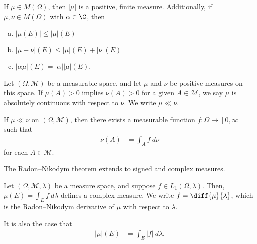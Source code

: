 \begin{fact}
  If $\mu\in M\left(\Omega\right)$, then $\left\vert \mu \right\vert$ is a positive, finite measure. Additionally, if $\mu,\nu\in M\left(\Omega\right)$ with $\alpha\in \C$, then
  \begin{enumerate}[(a)]
    \item $\left\vert \mu\left(E\right) \right\vert\leq \left\vert \mu \right\vert\left(E\right)$
    \item $\left\vert \mu + \nu \right\vert\left(E\right) \leq \left\vert \mu \right\vert\left(E\right) + \left\vert \nu \right\vert\left(E\right)$
    \item $\left\vert \alpha\mu \right\vert\left(E\right) = \left\vert \alpha \right\vert\left\vert \mu \right\vert\left(E\right)$.
  \end{enumerate}
\end{fact}
\begin{definition}
  Let $\left(\Omega,\mathcal{M}\right)$ be a measurable space, and let $\mu$ and $\nu$ be positive measures on this space. If $\mu(A) > 0$ implies $\nu(A) > 0$ for a given $A\in \mathcal{M}$, we say $\mu$ is absolutely continuous with respect to $\nu$. We write $\mu \ll \nu$.
\end{definition}
\begin{theorem}
  If $\mu \ll \nu$ on $\left(\Omega,\mathcal{M}\right)$, then there exists a measurable function $f: \Omega\rightarrow [0,\infty]$ such that
  \begin{align*}
    \nu(A) &= \int_{A}^{} f \:d\nu
  \end{align*}
  for each $A\in \mathcal{M}$.
\end{theorem}
\begin{remark}
The Radon--Nikodym theorem extends to signed and complex measures.
\end{remark}
\begin{fact}
  Let $\left(\Omega,\mathcal{M},\lambda\right)$ be a measure space, and suppose $f\in L_{1}\left(\Omega,\lambda\right)$. Then, $\mu\left(E\right) = \int_{E}^{} f\:d\lambda$ defines a complex measure. We write $f = \diff{\mu}{\lambda}$, which is the Radon--Nikodym derivative of $\mu$ with respect to $\lambda$.\newline

  It is also the case that
  \begin{align*}
    \left\vert \mu \right\vert\left(E\right) &= \int_{E}^{} \left\vert f \right\vert\:d\lambda.
  \end{align*}
\end{fact}
